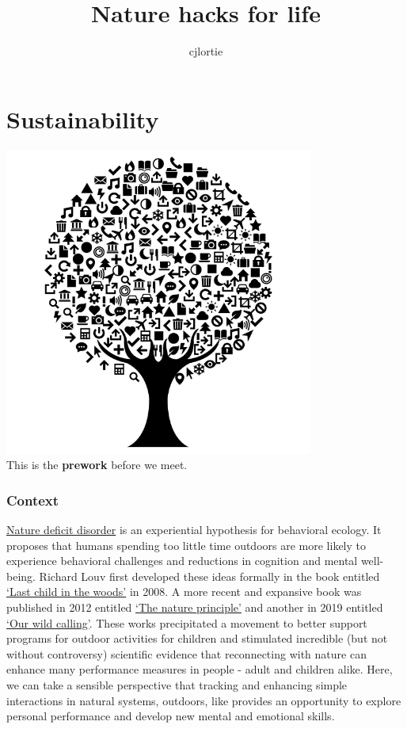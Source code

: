 \documentclass[
]{book}
\title{Nature hacks for life}
\author{cjlortie}
\date{}
\begin{document}
\maketitle

{
\setcounter{tocdepth}{1}
\tableofcontents
}
\hypertarget{sustainability}{%
\chapter{Sustainability}\label{sustainability}}

\includegraphics[width=4in,height=\textheight]{./tree.png}\\
This is the \textbf{prework} before we meet.

\hypertarget{context}{%
\subsection*{Context}\label{context}}

\href{https://en.wikipedia.org/wiki/Nature_deficit_disorder}{Nature deficit disorder} is an experiential hypothesis for behavioral ecology. It proposes that humans spending too little time outdoors are more likely to experience behavioral challenges and reductions in cognition and mental well-being. Richard Louv first developed these ideas formally in the book entitled \href{http://richardlouv.com/books/last-child}{`Last child in the woods'} in 2008. A more recent and expansive book was published in 2012 entitled \href{http://richardlouv.com/books/nature-principle}{`The nature principle'} and another in 2019 entitled \href{http://richardlouv.com/books/}{`Our wild calling'}. These works precipitated a movement to better support programs for outdoor activities for children and stimulated incredible (but not without controversy) scientific evidence that reconnecting with nature can enhance many performance measures in people - adult and children alike. Here, we can take a sensible perspective that tracking and enhancing simple interactions in natural systems, outdoors, like provides an opportunity to explore personal performance and develop new mental and emotional skills.
\end{document}
